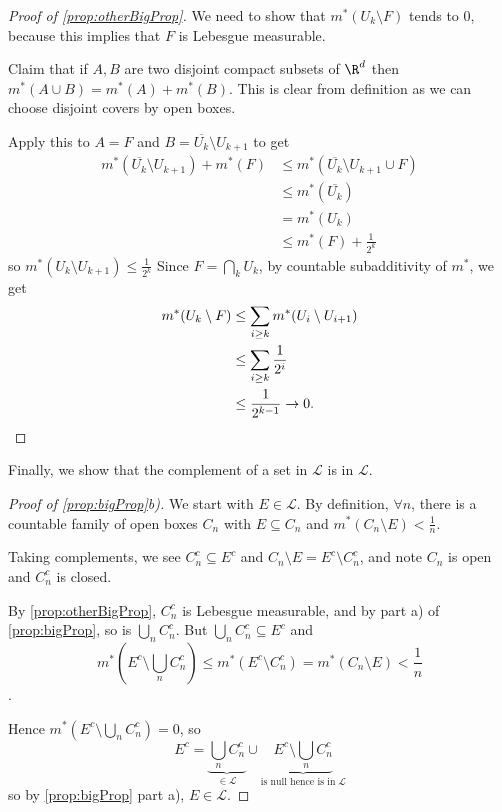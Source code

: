 \documentclass{article}
\newcommand{\1}[1]{\mathbbm{1}_{#1}}
\begin{document}
\begin{proof}[Proof of \cref{prop:otherBigProp}]
    We need to show that $m^*(U_k \setminus F)$ tends to $0$, because this implies that $F$ is Lebesgue measurable.

    Claim that if $A, B$ are two disjoint compact subsets of $\R^d$ then $m^*(A \cup B) = m^*(A) + m^*(B)$. This is clear from definition as we can choose disjoint covers by open boxes.

    Apply this to $A = F$ and $B = \overline{U_k} \setminus U_{k+1}$ to get
    \begin{align*}
        m^*(\overline{U_k} \setminus U_{k+1}) + m^*(F) &\leq m^*(\overline{U_k} \setminus U_{k+1} \cup F) \\
                                                       &\leq m^*(\overline{U_k}) \\
                                                       &= m^*(U_k) \\
                                                       &\leq m^*(F) + \frac1{2^k}
    \end{align*}
    so $m^*(U_k \setminus U_{k+1}) \leq \frac1{2^k}$
    Since $F = \bigcap_k U_k$, by countable subadditivity of $m^*$, we get
    \begin{align*}
        m^*(U_k \setminus F) &\leq \sum_{i \geq k} m^* (U_i \setminus U_{i+1}) \\
                             &\leq \sum_{i \geq k} \frac{1}{2^i} \\
                             &\leq \frac{1}{2^{k-1}} \to 0. \qedhere
    \end{align*}
\end{proof}

Finally, we show that the complement of a set in $\mathcal{L}$ is in $\mathcal{L}$.

\begin{proof}[Proof of \cref{prop:bigProp}b)]
    We start with $E \in \mathcal{L}$.  By definition, $\forall n$, there is a countable family of open boxes $C_n$ with $E \subseteq C_n$ and $m^* (C_n \setminus E) < \frac1n$.

    Taking complements, we see $C_n^c \subseteq E^c$ and $C_n \setminus E = E^c \setminus C_n^c$, and note $C_n$ is open and $C_n^c$ is closed.

    By \cref{prop:otherBigProp}, $C_n^c$ is Lebesgue measurable, and by part a) of \cref{prop:bigProp}, so is $\bigcup_n C_n^c$. But $\bigcup_n C_n^c \subseteq E^c$ and \begin{equation*}m^*\left(E^c \setminus \bigcup_n C_n^c\right) \leq m^*(E^c \setminus C_n^c) = m^* (C_n \setminus E) < \frac1n\end{equation*}.

    Hence $m^* (E^c \setminus \bigcup_n C_n^c) = 0$, so
    \begin{equation*}
        E^c = \underbrace{\bigcup_n C_n^c}_{\in \mathcal{L}} \cup \underbrace{E^c \setminus \bigcup_n C_n^c}_{\text{is null hence is in} \; \mathcal{L}}
    \end{equation*}
    so by \cref{prop:bigProp} part a), $E \in \mathcal{L}$.
\end{proof}
\end{document}
